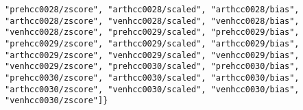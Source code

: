 \documentclass{article}         %
\theoremstyle{definition}
\theoremstyle{remark}
\begin{document}
\begin{verbatim}
"prehcc0028/zscore", "arthcc0028/scaled", "arthcc0028/bias", "arthcc0028/zscore", "venhcc0028/scaled", "venhcc0028/bias", "venhcc0028/zscore", "prehcc0029/scaled", "prehcc0029/bias", "prehcc0029/zscore", "arthcc0029/scaled", "arthcc0029/bias", "arthcc0029/zscore", "venhcc0029/scaled", "venhcc0029/bias", "venhcc0029/zscore", "prehcc0030/scaled", "prehcc0030/bias", "prehcc0030/zscore", "arthcc0030/scaled", "arthcc0030/bias", "arthcc0030/zscore", "venhcc0030/scaled", "venhcc0030/bias", "venhcc0030/zscore"]}
\end{verbatim}
\end{document}
